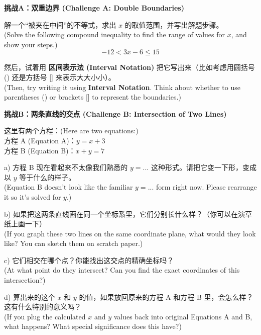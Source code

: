 \documentclass[12pt]{article}
\begin{document}
\textbf{挑战A：双重边界 (Challenge A: Double Boundaries)}

解一个“被夹在中间”的不等式，求出 $x$ 的取值范围，并写出解题步骤。\\
(Solve the following compound inequality to find the range of values for $x$, and show your steps.)
\[ -12 < 3x - 6 \le 15 \]
\vspace{4cm}

然后，试着用 \textbf{区间表示法 (Interval Notation)} 把它写出来（比如考虑用圆括号 () 还是方括号 [] 来表示大大小小）。\\
(Then, try writing it using \textbf{Interval Notation}. Think about whether to use parentheses () or brackets [] to represent the boundaries.)
\vspace{2.5cm}


\textbf{挑战B：两条直线的交点 (Challenge B: Intersection of Two Lines)}

这里有两个方程：(Here are two equations:)\\
方程 A (Equation A)：$y = x + 3$ \\
方程 B (Equation B)：$x + y = 7$

a) 方程 B 现在看起来不太像我们熟悉的 $y = ...$ 这种形式。请把它变一下形，变成以 $y$ 等于什么的样子。\\
(Equation B doesn't look like the familiar $y = ...$ form right now. Please rearrange it so it's solved for $y$.)
\vspace{2cm}

b) 如果把这两条直线画在同一个坐标系里，它们分别长什么样？（你可以在演草纸上画一下）\\
(If you graph these two lines on the same coordinate plane, what would they look like? You can sketch them on scratch paper.)
\vspace{4.5cm}

c) 它们相交在哪个点？你能找出这交点的精确坐标吗？\\
(At what point do they intersect? Can you find the exact coordinates of this intersection?)
\vspace{1.5cm}

d) 算出来的这个 $x$ 和 $y$ 的值，如果放回原来的方程 A 和方程 B 里，会怎么样？这有什么特别的意义吗？\\
(If you plug the calculated $x$ and $y$ values back into original Equations A and B, what happens? What special significance does this have?)
\vspace{3cm}
\end{document}

